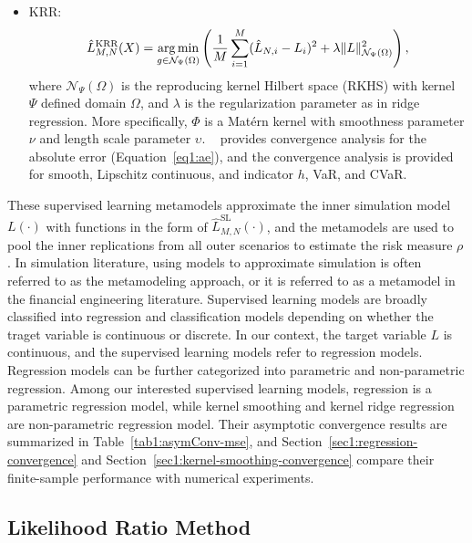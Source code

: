 \begin{itemize}
    \item   KRR:
            $$\hat{L}^{\text{KRR}}_{M, N}(X) = \operatorname*{arg\,min}_{g \in \mathcal{N}_{\Psi}(\Omega)} \left( \frac{1}{M} \sum_{i=1}^M (\hat{L}_{N, i} - L_i)^2 + \lambda \|L\|_{\mathcal{N}_{\Psi}(\Omega)}^2\right),$$
            where $\mathcal{N}_{\Psi}(\Omega)$ is the reproducing kernel Hilbert space (RKHS) with kernel $\Psi$ defined domain $\Omega$, and $\lambda$ is the regularization parameter as in ridge regression. 
            More specifically, $\Phi$ is a Mat\'ern kernel with smoothness parameter $\nu$ and length scale parameter $\upsilon$.
            ~\cite{wang2022smooth} provides convergence analysis for the absolute error (Equation~\ref{eq1:ae}), and the convergence analysis is provided for smooth, Lipschitz continuous, and indicator $h$, VaR, and CVaR.
\end{itemize}

These supervised learning metamodels approximate the inner simulation model $L(\cdot)$ with functions in the form of $\hat{L}^{\text{SL}}_{M, N}(\cdot)$, and the metamodels are used to pool the inner replications from all outer scenarios to estimate the risk measure $\rho$.
In simulation literature, using models to approximate simulation is often referred to as the metamodeling approach, or it is referred to as a metamodel in the financial engineering literature.
Supervised learning models are broadly classified into regression and classification models depending on whether the traget variable is continuous or discrete.
In our context, the target variable $L$ is continuous, and the supervised learning models refer to regression models.
Regression models can be further categorized into parametric and non-parametric regression.
Among our interested supervised learning models, regression is a parametric regression model, while kernel smoothing and kernel ridge regression are non-parametric regression model.
Their asymptotic convergence results are summarized in Table~\ref{tab1:asymConv-mse}, and Section~\ref{sec1:regression-convergence} and Section~\ref{sec1:kernel-smoothing-convergence} compare their finite-sample performance with numerical experiments.

\subsection{Likelihood Ratio Method}

